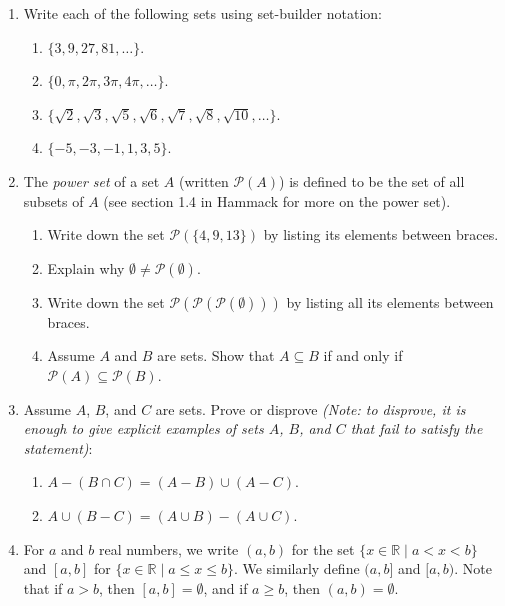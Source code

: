 \documentclass{amsart}
\theoremstyle{definition}
\begin{document}
\begin{enumerate}
\item Write each of the following sets using set-builder notation:

    \begin{enumerate}
    \item $\{3, 9, 27, 81, \ldots\}$.
    \item $\{0, \pi, 2\pi, 3\pi, 4\pi, \ldots\}$.
    \item $\{\sqrt{2}, \sqrt{3}, \sqrt{5}, \sqrt{6}, \sqrt{7}, \sqrt{8}, \sqrt{10}, \ldots\}$.
    \item $\{-5, -3, -1, 1, 3, 5\}$.
    \end{enumerate}
    
  \item The \emph{power set} of a set $A$ (written $\mathcal{P} (A)$) is defined to be the set of all subsets of $A$ (see section 1.4 in Hammack for more on the power set).

    \begin{enumerate}
    \item Write down the set $\mathcal{P} (\{4, 9, 13\})$ by listing its elements between braces.
    \item Explain why $\emptyset \neq \mathcal{P}(\emptyset)$.
    \item Write down the set $\mathcal{P} (\mathcal{P} (\mathcal{P} (\emptyset)))$ by listing all its elements between braces.
    \item Assume $A$ and $B$ are sets. Show that $A \subseteq B$ if and only if $\mathcal{P} (A) \subseteq \mathcal{P} (B)$.
    \end{enumerate}
  \item Assume $A$, $B$, and $C$ are sets. Prove or disprove \emph{(Note: to disprove, it is enough to give explicit examples of sets $A$, $B$, and $C$ that fail to satisfy the statement)}:
    \begin{enumerate}
    \item $A - (B \cap C) = (A - B) \cup (A - C)$.
    \item $A \cup (B - C) = (A \cup B) - (A \cup C)$.
    \end{enumerate}
  \item For $a$ and $b$ real numbers, we write $(a, b)$ for the set $\{x \in \mathbb{R} \mid a < x < b\}$  and $[a, b]$ for $\{x \in \mathbb{R} \mid a \le x \le b\}$. We similarly define $(a, b]$ and $[a, b)$. Note that if $a > b$, then $[a, b] = \emptyset$, and if $a \ge b$, then $(a, b) = \emptyset$.


\end{enumerate}
\end{document}
